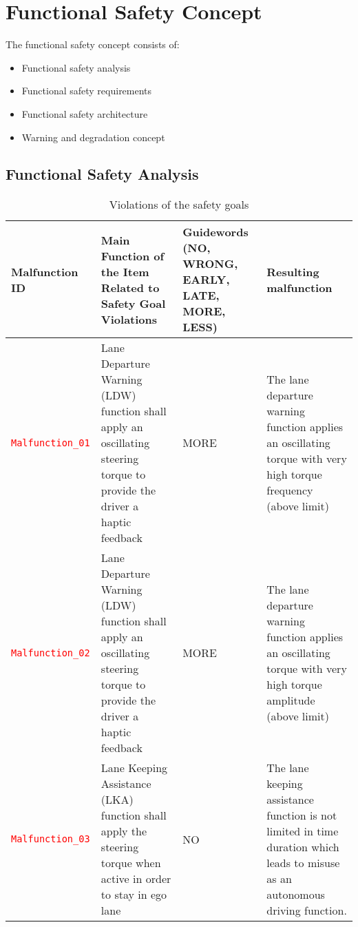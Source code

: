 \chapter{Functional Safety Concept}
\label{ch:concept}

The functional safety concept consists of:
\begin{itemize}
  \item Functional safety analysis
  \item Functional safety requirements
  \item Functional safety architecture
  \item Warning and degradation concept
\end{itemize}


\section{Functional Safety Analysis}


\begin{table}[!htpb]
\caption{Violations of the safety goals}
\begin{center}
\scriptsize
\renewcommand{\arraystretch}{1.4}
\begin{tabular}{ L{2.7cm}|L{3.5cm}|L{2.3cm}|L{4.3cm}  }
 \hline
{}
Malfunction ID   &
Main Function of the Item Related to Safety Goal Violations  &
Guidewords (NO, WRONG, EARLY, LATE, MORE, LESS) &
Resulting malfunction  \\\hline
\textcolor{red}{\texttt{Malfunction\_01}}  &
Lane Departure Warning (LDW) function shall apply an oscillating steering
torque to provide the driver a haptic feedback  &
MORE  &
The lane departure warning function applies an oscillating torque with very
high torque frequency (above limit)\\\hline
\textcolor{red}{\texttt{Malfunction\_02}}  &
Lane Departure Warning (LDW) function shall apply an oscillating steering
torque to provide the driver a haptic feedback  &
MORE  &
The lane departure warning function applies an oscillating torque with very
high torque amplitude (above limit)\\\hline
\textcolor{red}{\texttt{Malfunction\_03}}  &
Lane Keeping Assistance (LKA) function shall apply the steering torque when
active in order to stay in ego lane  &
NO  &
The lane keeping assistance function is not limited in time duration which
leads to misuse as an autonomous driving function.\\\hline
\end{tabular}
\end{center}
\label{tab:malfunctions}
\end{table}


